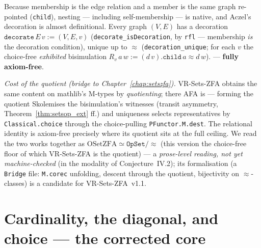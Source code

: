 \begin{theorem}
\label{thm:setsop_afa}
\leanok
{}
Because membership is the edge relation and a member is the same graph re-pointed
(\texttt{child}), nesting --- including self-membership --- is native, and Aczel's
decoration is almost definitional.  Every graph $(V,E)$ has a decoration
$\texttt{decorate}\,E\,v:=(V,E,v)$ (\texttt{decorate\_isDecoration}, by
\texttt{rfl} --- membership \emph{is} the decoration condition), unique up to
$\approx$ (\texttt{decoration\_unique}; for each $v$ the choice-free
\emph{exhibited} bisimulation $R_v\,a\,w := (d\,v).\texttt{child}\,a \approx
d\,w$).  \axiomprofile{[]} --- \textbf{fully axiom-free}.

\emph{Cost of the quotient (bridge to Chapter~\ref{chap:setszfa}).}  VR-Sets-ZFA
obtains the same content on mathlib's M-types by \emph{quotienting}; there AFA is
 --- forming the quotient
Skolemises the bisimulation's witnesses (transit asymmetry,
Theorem~\ref{thm:setsop_ext} ff.) and uniqueness selects representatives by
\texttt{Classical.choice} through the choice-pulling \texttt{PFunctor.M.dest}.
The relational identity is axiom-free precisely where its quotient sits at the
full ceiling.  We read the two works together as
$\mathrm{OSetZFA}\simeq\texttt{OpSet}/\!\approx$ (this version the choice-free
floor of which VR-Sets-ZFA is the quotient) --- a \emph{prose-level reading, not
yet machine-checked} (in the modality of Conjecture~IV.2); its formalisation (a
\texttt{Bridge} file: \texttt{M.corec} unfolding, descent through the quotient,
bijectivity on $\approx$-classes) is a candidate for VR-Sets-ZFA~v1.1.
\end{theorem}

\section{Cardinality, the diagonal, and choice --- the corrected core}
\label{sec:setsop_cardinality}

